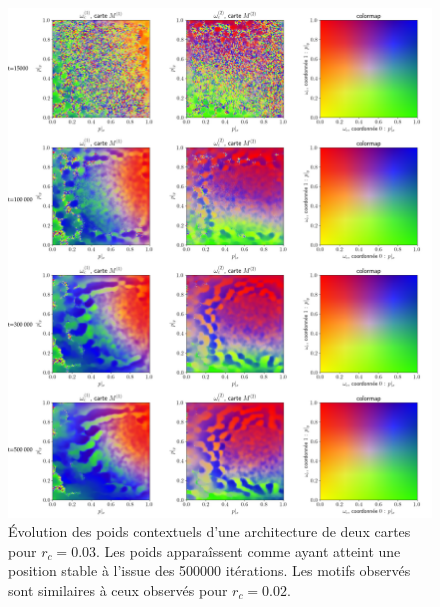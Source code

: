 \documentclass[../main]{subfiles}
\begin{document}
\begin{figure}[p]
	\includegraphics[width=\textwidth]{2SOM_sphere_rc003_evol.pdf}
	\caption{\'Evolution des poids contextuels d'une architecture de deux cartes pour $r_c =0.03$. Les poids apparaîssent comme ayant atteint une position stable à l'issue des 500000 itérations.
	Les motifs observés sont similaires à ceux observés pour $r_c = 0.02$. \label{fig:rc_003}}
\end{figure}
\end{document}
